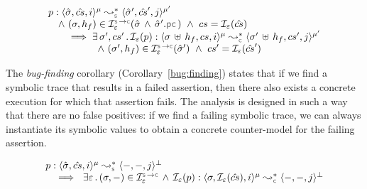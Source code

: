 
\vspace*{-0.1cm}
\begin{theorem}\label{teo:soundness:jsil:symb:exe}
$$
\begin{array}{l}
\prog : \transabssemrule{\sstate, \scs, i}{\sstate', \scs', j}{\mode}{\mode'}{\symbolic} 
    \\ \quad \wedge \ (\jstate, \heap_f) \in \interpret{\symbconc}{\senv}(\sstate \, \wedge \, \sstate'.\pcsel) \ \wedge \ \cs = \shorthand(\scs) \\ \qquad \implies \exists \, \jstate', \cs' \, . \,
        \shorthand(\prog) : \transabssemrule{\jstate \dunion \heap_f, \cs, i}{\jstate' \dunion \heap_f, \cs', j}{\mode}{\mode'}{\concrete} \\ \qquad \qquad \quad
               \wedge \ (\jstate', \heap_f) \in \interpret{\symbconc}{\senv}(\sstate')
               \ \wedge \ \cs' = \shorthand(\scs')
\end{array}
$$
\end{theorem}

The \emph{bug-finding} corollary (Corollary~\ref{bug:finding}) states that if 
we find a symbolic trace that results in a failed assertion, 
then there also exists a concrete execution for which that assertion fails.
The analysis is designed in such a way that there are no false positives: 
if we find a failing symbolic trace,
we can always instantiate its symbolic values to obtain a concrete counter-model for the 
failing assertion. %

\vspace*{-0.1cm}
\begin{corollary}\label{bug:finding}
$$
\begin{array}{l}
\prog : \transabssemrule{\sstate, \scs, i}{-, -, j}{\mode}{\bot}{\symbolic}  \\ \quad  
%
   \implies \  \exists \senv \, . \, (\jstate, -) \in \interpret{\symbconc}{\senv} \, \wedge \, 
          \shorthand(\prog) :  \transabssemrule{\jstate, \shorthand(\scs), i}{-, -, j}{\mode}{\bot}{\concrete} 
\end{array}
$$
\end{corollary}

